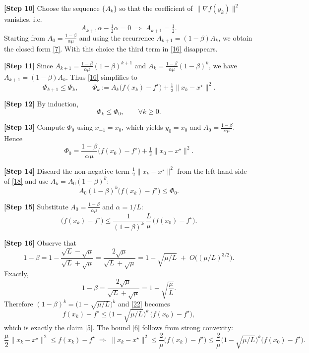 \documentclass{article}
\begin{document}
\noindent\textbf{[Step 10]}  Choose the sequence $\{A_{k}\}$ so that the
coefficient of $\|\nabla f(y_{k})\|^{2}$ vanishes, i.e.
\[
A_{k+1}\alpha-\tfrac12\alpha=0
\;\Longrightarrow\;
A_{k+1}= \tfrac12.
\tag{17}
\]
Starting from $A_{0}= \frac{1-\beta}{\alpha\mu}$ and using the recurrence
$A_{k+1}= (1-\beta)A_{k}$, we obtain the closed form \eqref{7}.  With this
choice the third term in \eqref{16} disappears.

\noindent\textbf{[Step 11]}  Since $A_{k+1}=\frac{1-\beta}{\alpha\mu}(1-\beta)^{k+1}$
and $A_{k}= \frac{1-\beta}{\alpha\mu}(1-\beta)^{k}$, we have $A_{k+1}= (1-\beta)A_{k}$.
Thus \eqref{16} simplifies to
\[
\Phi_{k+1}\le \Phi_{k},
\qquad
\Phi_{k}:=A_{k}\bigl(f(x_{k})-f^{\star}\bigr)
          +\tfrac12\|x_{k}-x^{\star}\|^{2}.
\tag{18}
\]

\noindent\textbf{[Step 12]}  By induction,
\[
\Phi_{k}\le\Phi_{0},\qquad\forall k\ge0.
\tag{19}
\]

\noindent\textbf{[Step 13]}  Compute $\Phi_{0}$ using $x_{-1}=x_{0}$, which yields
$y_{0}=x_{0}$ and $A_{0}= \frac{1-\beta}{\alpha\mu}$.  Hence
\[
\Phi_{0}= \frac{1-\beta}{\alpha\mu}\bigl(f(x_{0})-f^{\star}\bigr)
        +\tfrac12\|x_{0}-x^{\star}\|^{2}.
\tag{20}
\]

\noindent\textbf{[Step 14]}  Discard the non‑negative term $\tfrac12\|x_{k}-x^{\star}\|^{2}$
from the left‑hand side of \eqref{18} and use $A_{k}=A_{0}(1-\beta)^{k}$:
\[
A_{0}(1-\beta)^{k}\bigl(f(x_{k})-f^{\star}\bigr)
\le \Phi_{0}.
\tag{21}
\]

\noindent\textbf{[Step 15]}  Substitute $A_{0}= \frac{1-\beta}{\alpha\mu}$ and
$\alpha=1/L$:
\[
\bigl(f(x_{k})-f^{\star}\bigr)
\le
\frac{1}{(1-\beta)^{k}}\,
\frac{L}{\mu}\,
\bigl(f(x_{0})-f^{\star}\bigr).
\tag{22}
\]

\noindent\textbf{[Step 16]}  Observe that
\[
1-\beta = 1-\frac{\sqrt{L}-\sqrt{\mu}}{\sqrt{L}+\sqrt{\mu}}
        = \frac{2\sqrt{\mu}}{\sqrt{L}+\sqrt{\mu}}
        = 1-\sqrt{\mu/L}\;+\;O\!\bigl((\mu/L)^{3/2}\bigr).
\]
Exactly,
\[
1-\beta = \frac{2\sqrt{\mu}}{\sqrt{L}+\sqrt{\mu}}
        = 1-\sqrt{\frac{\mu}{L}}.
\tag{23}
\]
Therefore $(1-\beta)^{k}= \bigl(1-\sqrt{\mu/L}\bigr)^{k}$ and \eqref{22}
becomes
\[
f(x_{k})-f^{\star}\le
\bigl(1-\sqrt{\mu/L}\bigr)^{k}\,
\bigl(f(x_{0})-f^{\star}\bigr),
\]
which is exactly the claim \eqref{5}.  The bound \eqref{6} follows from
strong convexity:
\[
\frac{\mu}{2}\|x_{k}-x^{\star}\|^{2}
\le f(x_{k})-f^{\star}
\;\Longrightarrow\;
\|x_{k}-x^{\star}\|^{2}
\le\frac{2}{\mu}\bigl(f(x_{k})-f^{\star}\bigr)
\le\frac{2}{\mu}\bigl(1-\sqrt{\mu/L}\bigr)^{k}
\bigl(f(x_{0})-f^{\star}\bigr).
\tag{24}
\]
\end{document}
